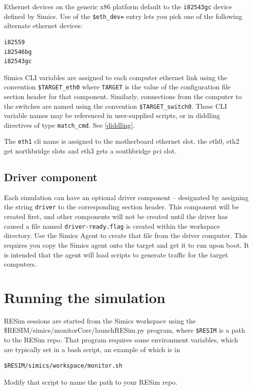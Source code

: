\documentclass[titlepage]{article}
\begin{document}
Ethernet devices on the generic x86 platform default to the {\tt i82543gc} device defined by Simics.  Use of the {\tt \$eth\_dev=} 
entry lets you pick one of the following alternate ethernet devices:
\begin{verbatim}
i82559
i82546bg
i82543gc
\end{verbatim}

Simics CLI variables are assigned to each computer ethernet link using the convention {\tt \$TARGET\_eth0} where {\tt TARGET}
is the value of the configuration file section header for that component.  Similarly, connections from the computer to the switches 
are named using the convention {\tt \$TARGET\_switch0}.  These CLI variable names may be referenced in user-supplied scripts, or in 
diddling directives of type {\tt match\_cmd}.  See \ref{diddling}.

The {\tt eth1} cli name is assigned to the motherboard ethernet slot. the eth0, eth2 get northbridge slots and eth3 gets a southbridge pci slot.

\subsection{Driver component}
Each simulation can have an optional driver component -- designated by assigning the string {\tt driver} to the corresponding
section header.  This component will be created first, and other components will not be created until the driver has
caused a file named {\tt driver-ready.flag} is created within the workspace directory.  Use the Simics Agent to 
create that file from the driver computer.  This requires you copy the Simics agent onto the target and get it to run
upon boot.  It is intended that the agent will load scripts to generate traffic for the target computers.

\section{Running the simulation}
RESim sessions are started from the Simics workspace using the \$RESIM/simics/monitorCore/launchRESim.py program,
where {\tt \$RESIM} is a path to the RESim repo.  That program requires some environment variables, which are typically
set in a bash script, an example of which is in
\begin{verbatim}
$RESIM/simics/workspace/monitor.sh
\end{verbatim}
\noindent Modify that script to name the path to your RESim repo.
\end{document}
